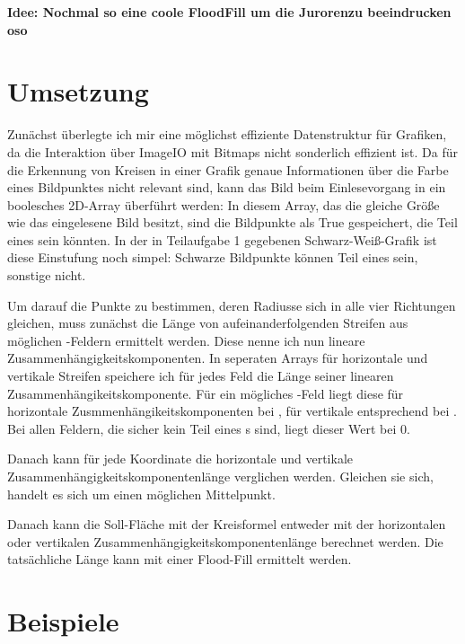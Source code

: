 \textbf{Idee: Nochmal so eine coole FloodFill um die Jurorenzu beeindrucken oso}
\section{Umsetzung}
Zunächst überlegte ich mir eine möglichst effiziente Datenstruktur für Grafiken, da die Interaktion über ImageIO mit Bitmaps nicht sonderlich effizient ist. Da für die Erkennung von Kreisen in einer Grafik genaue Informationen über die Farbe eines Bildpunktes nicht relevant sind, kann das Bild beim Einlesevorgang in ein boolesches 2D-Array überführt werden: In diesem Array, das die gleiche Größe wie das eingelesene Bild besitzt, sind die Bildpunkte als True gespeichert, die Teil eines \task sein könnten. In der in Teilaufgabe 1 gegebenen Schwarz-Weiß-Grafik ist diese Einstufung noch simpel: Schwarze Bildpunkte können Teil eines \task sein, sonstige nicht.

Um darauf die Punkte zu bestimmen, deren Radiusse sich in alle vier Richtungen gleichen, muss zunächst die Länge von aufeinanderfolgenden Streifen aus möglichen \task{}-Feldern ermittelt werden. Diese nenne ich nun lineare Zusammenhängigkeitskomponenten. In seperaten Arrays für horizontale und vertikale Streifen speichere ich für jedes Feld die Länge seiner linearen Zusammenhängikeitskomponente. Für ein mögliches \task{}-Feld liegt diese für horizontale Zusmmenhängikeitskomponenten bei
, für vertikale entsprechend bei
. Bei allen Feldern, die sicher kein Teil eines \task{}s sind, liegt dieser Wert bei 0. 

Danach kann für jede Koordinate die horizontale und vertikale Zusammenhängigkeitskomponentenlänge verglichen werden. Gleichen sie sich, handelt es sich um einen möglichen Mittelpunkt.

Danach kann die Soll-Fläche mit der Kreisformel entweder mit der horizontalen oder vertikalen Zusammenhängigkeitskomponentenlänge berechnet werden. Die tatsächliche Länge kann mit einer Flood-Fill ermittelt werden.

\section{Beispiele}
